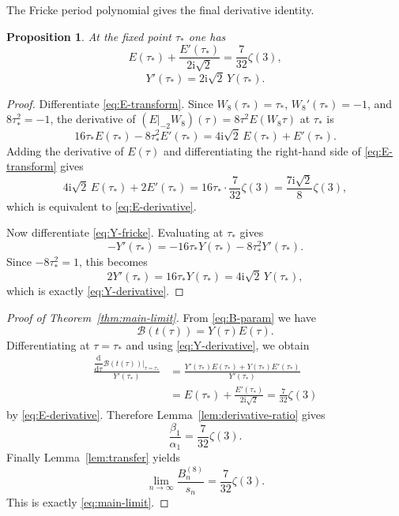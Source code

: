 \documentclass[11pt]{amsart}
\numberwithin{equation}{section}
\theoremstyle{plain}
\newtheorem{proposition}[theorem]{Proposition}
\theoremstyle{definition}
\theoremstyle{remark}
\newcommand{\dd}{\mathrm{d}}
\newcommand{\ii}{\mathrm{i}}
\begin{document}
The Fricke period polynomial gives the final derivative identity.

\begin{proposition}\label{prop:derivative-identities}
At the fixed point $\tau_*$ one has
\begin{equation}\label{eq:E-derivative}
E(\tau_*)+\frac{E'(\tau_*)}{2\ii\sqrt2}=\frac{7}{32}\zeta(3),
\end{equation}
\begin{equation}\label{eq:Y-derivative}
Y'(\tau_*)=2\ii\sqrt2\,Y(\tau_*).
\end{equation}
\end{proposition}

\begin{proof}
Differentiate \eqref{eq:E-transform}. Since $W_8(\tau_*)=\tau_*$, $W_8'(\tau_*)=-1$, and $8\tau_*^2=-1$, the derivative of $(E|_{-2}W_8)(\tau)=8\tau^2E(W_8\tau)$ at $\tau_*$ is
\[
16\tau_*E(\tau_*)-8\tau_*^2E'(\tau_*)
=4\ii\sqrt2\,E(\tau_*)+E'(\tau_*).
\]
Adding the derivative of $E(\tau)$ and differentiating the right-hand side of \eqref{eq:E-transform} gives
\[
4\ii\sqrt2\,E(\tau_*)+2E'(\tau_*)=16\tau_*\cdot\frac{7}{32}\zeta(3)=\frac{7\ii\sqrt2}{8}\zeta(3),
\]
which is equivalent to \eqref{eq:E-derivative}.

Now differentiate \eqref{eq:Y-fricke}. Evaluating at $\tau_*$ gives
\[
-Y'(\tau_*)=-16\tau_*Y(\tau_*)-8\tau_*^2Y'(\tau_*).
\]
Since $-8\tau_*^2=1$, this becomes
\[
2Y'(\tau_*)=16\tau_*Y(\tau_*)=4\ii\sqrt2\,Y(\tau_*),
\]
which is exactly \eqref{eq:Y-derivative}.
\end{proof}

\begin{proof}[Proof of Theorem~\ref{thm:main-limit}]
From \eqref{eq:B-param} we have
\[
\mathcal B(t(\tau))=Y(\tau)E(\tau).
\]
Differentiating at $\tau=\tau_*$ and using \eqref{eq:Y-derivative}, we obtain
\begin{align*}
\frac{\dfrac{\dd}{\dd\tau}\mathcal B(t(\tau))\big|_{\tau=\tau_*}}{Y'(\tau_*)}
&=\frac{Y'(\tau_*)E(\tau_*)+Y(\tau_*)E'(\tau_*)}{Y'(\tau_*)}\\
&=E(\tau_*)+\frac{E'(\tau_*)}{2\ii\sqrt2}
=\frac{7}{32}\zeta(3)
\end{align*}
by \eqref{eq:E-derivative}. Therefore Lemma~\ref{lem:derivative-ratio} gives
\[
\frac{\beta_1}{\alpha_1}=\frac{7}{32}\zeta(3).
\]
Finally Lemma~\ref{lem:transfer} yields
\[
\lim_{n\to\infty}\frac{B_n^{(8)}}{s_n}=\frac{7}{32}\zeta(3).
\]
This is exactly \eqref{eq:main-limit}.
\end{proof}
\end{document}
